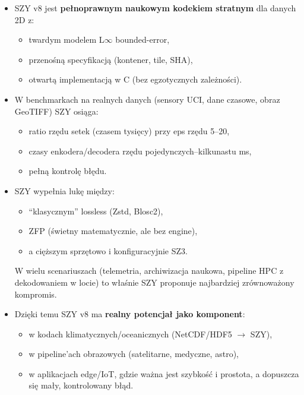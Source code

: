 \documentclass[11pt,a4paper]{article}
\newif\ifincludeplots
\begin{document}
\begin{itemize}
  \item SZY v8 jest \textbf{pełnoprawnym naukowym kodekiem stratnym} dla danych 2D z:
        \begin{itemize}
          \item twardym modelem L$\infty$ bounded-error,
          \item przenośną specyfikacją (kontener, tile, SHA),
          \item otwartą implementacją w C (bez egzotycznych zależności).
        \end{itemize}
  \item W benchmarkach na realnych danych (sensory UCI, dane czasowe, obraz GeoTIFF) SZY osiąga:
        \begin{itemize}
          \item ratio rzędu setek (czasem tysięcy) przy eps rzędu 5--20,
          \item czasy enkodera/decodera rzędu pojedynczych--kilkunastu ms,
          \item pełną kontrolę błędu.
        \end{itemize}
  \item SZY wypełnia lukę między:
        \begin{itemize}
          \item ``klasycznym'' lossless (Zstd, Blosc2),
          \item ZFP (świetny matematycznie, ale bez engine),
          \item a cięższym sprzętowo i konfiguracyjnie SZ3.
        \end{itemize}
        W wielu scenariuszach (telemetria, archiwizacja naukowa, pipeline HPC z dekodowaniem w locie) to właśnie SZY proponuje najbardziej zrównoważony kompromis.
  \item Dzięki temu SZY v8 ma \textbf{realny potencjał jako komponent}:
        \begin{itemize}
          \item w kodach klimatycznych/oceanicznych (NetCDF/HDF5 $\rightarrow$ SZY),
          \item w pipeline'ach obrazowych (satelitarne, medyczne, astro),
          \item w aplikacjach edge/IoT, gdzie ważna jest szybkość i prostota, a dopuszcza się mały, kontrolowany błąd.
        \end{itemize}
\end{itemize}

\FloatBarrier
\clearpage
\ifincludeplots
\end{document}
